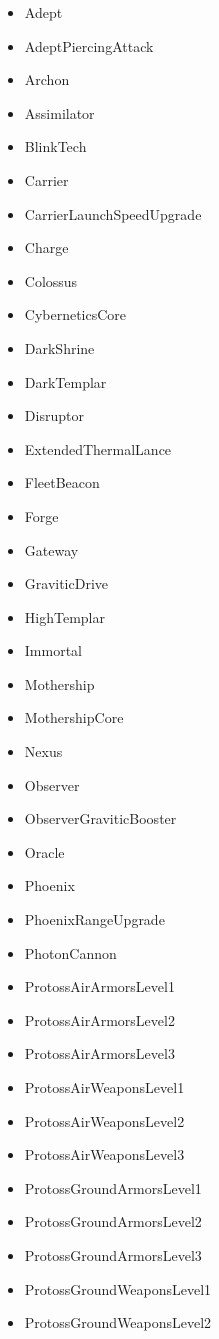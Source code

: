 \begin{anexosenv}
\begin{multicols}{2}
	\begin{itemize}
		\item Adept
		\item AdeptPiercingAttack
		\item Archon
		\item Assimilator
		\item BlinkTech
		\item Carrier
		\item CarrierLaunchSpeedUpgrade
		\item Charge
		\item Colossus
		\item CyberneticsCore
		\item DarkShrine
		\item DarkTemplar
		\item Disruptor
		\item ExtendedThermalLance
		\item FleetBeacon
		\item Forge
		\item Gateway
		\item GraviticDrive
		\item HighTemplar
		\item Immortal
		\item Mothership
		\item MothershipCore
		\item Nexus
		\item Observer
		\item ObserverGraviticBooster
		\item Oracle
		\item Phoenix
		\item PhoenixRangeUpgrade
		\item PhotonCannon
		\item ProtossAirArmorsLevel1
		\item ProtossAirArmorsLevel2
		\item ProtossAirArmorsLevel3
		\item ProtossAirWeaponsLevel1
		\item ProtossAirWeaponsLevel2
		\item ProtossAirWeaponsLevel3
		\item ProtossGroundArmorsLevel1
		\item ProtossGroundArmorsLevel2
		\item ProtossGroundArmorsLevel3
		\item ProtossGroundWeaponsLevel1
		\item ProtossGroundWeaponsLevel2

\end{itemize}
\end{multicols}
\end{anexosenv}
